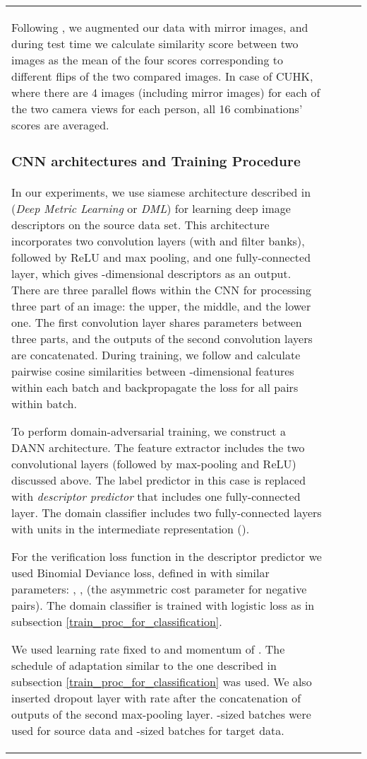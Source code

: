 \documentclass[twoside,11pt]{article}
\begin{document}
\begin{table*}[t]
{\begin{tabular}{lccc}
Following \citet{YiLL14}, we augmented our data with mirror images, and during test time we calculate similarity score between two images as the mean of the four scores corresponding to different flips of the two compared images. In case of CUHK, where there are 4 images (including mirror images) for each of the two camera views for each person, all 16 combinations' scores are averaged. 

\subsubsection{CNN architectures and Training Procedure} 

In our experiments, we use siamese architecture described in \citet{YiLL14} (\textit{Deep Metric Learning} or \textit{DML}) for learning deep image descriptors on the source data set.
This architecture incorporates two convolution layers (with  and  filter banks), followed by ReLU and max pooling, and one fully-connected layer, which gives -dimensional descriptors as an output. There are three parallel flows within the CNN for processing three part of an image: the upper, the middle, and the lower one. The first convolution layer shares parameters between three parts, and the outputs of the second convolution layers are concatenated.
During training, we follow \citet{YiLL14} and calculate pairwise cosine similarities between -dimensional features within each batch and backpropagate the loss for all pairs within batch. 

To perform domain-adversarial training, we construct a DANN architecture.  The feature extractor includes the two convolutional layers (followed by max-pooling and ReLU) discussed above. The label predictor in this case is replaced with \textit{descriptor predictor} that includes one fully-connected layer. The domain classifier includes two fully-connected layers with  units in the intermediate representation (). 

For the verification loss function in the descriptor predictor we used Binomial Deviance loss, defined in \citet{YiLL14} with similar parameters: , ,  (the asymmetric cost parameter for negative pairs). The domain classifier is trained with logistic loss as in subsection  \ref{train_proc_for_classification}.

We used learning rate fixed to  and momentum of . The schedule of adaptation similar to the one described in subsection \ref{train_proc_for_classification} was used. We also inserted dropout layer with rate  after the concatenation of outputs of the second max-pooling layer. -sized batches were used for source data and -sized batches for target data. 


\end{tabular}}
\end{table*}
\end{document}
